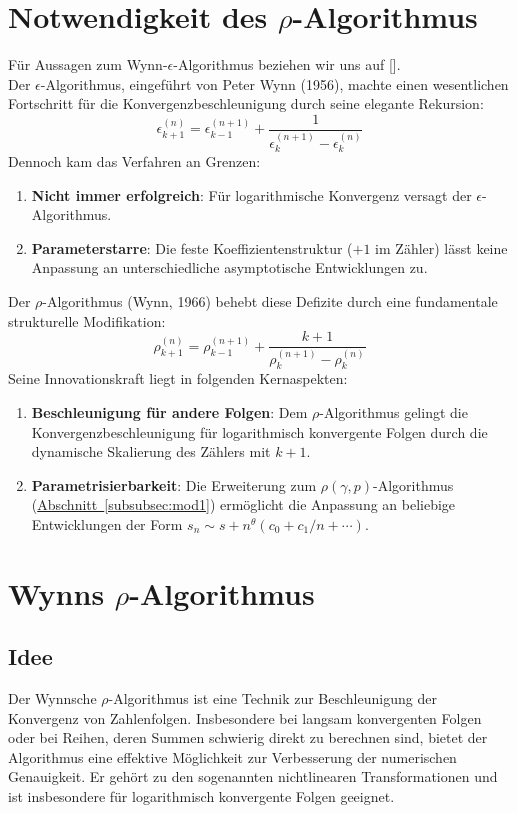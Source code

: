 \documentclass[a4paper,12pt]{article}
\numberwithin{equation}{section}
\newcommand{\secref}[1]{\hyperref[#1]{Abschnitt~\ref*{#1}}}
\theoremstyle{remark}
\begin{document}
\section{Notwendigkeit des $\rho$-Algorithmus}\label{sec:notwendigkeit}
Für Aussagen zum Wynn-$\epsilon$-Algorithmus beziehen wir uns auf [\cite{wynn1966convergence}].\\

Der $\epsilon$-Algorithmus, eingeführt von Peter Wynn (1956), machte einen wesentlichen Fortschritt für die Konvergenzbeschleunigung durch seine elegante Rekursion:
\[
\epsilon_{k+1}^{(n)} = \epsilon_{k-1}^{(n+1)} + \frac{1}{\epsilon_k^{(n+1)} - \epsilon_k^{(n)}}
\]
Dennoch kam das Verfahren an Grenzen:
\begin{enumerate}
\item \textbf{Nicht immer erfolgreich}: Für logarithmische Konvergenz  versagt der $\epsilon$-Algorithmus.
\item \textbf{Parameterstarre}: Die feste Koeffizientenstruktur ($+1$ im Zähler) lässt keine Anpassung an unterschiedliche asymptotische Entwicklungen zu.
\end{enumerate}
Der $\rho$-Algorithmus (Wynn, 1966) behebt diese Defizite durch eine fundamentale strukturelle Modifikation:
\[
\rho_{k+1}^{(n)} = \rho_{k-1}^{(n+1)} + \frac{k+1}{\rho_k^{(n+1)} - \rho_k^{(n)}}
\]
Seine Innovationskraft liegt in folgenden Kernaspekten:
\begin{enumerate}
\item \textbf{Beschleunigung für andere Folgen}: Dem $\rho$-Algorithmus gelingt die Konvergenzbeschleunigung für logarithmisch konvergente Folgen durch die dynamische Skalierung des Zählers mit $k+1$.
\item \textbf{Parametrisierbarkeit}: Die Erweiterung zum $\rho(\gamma,p)$-Algorithmus (\secref{subsubsec:mod1}) ermöglicht die Anpassung an beliebige Entwicklungen der Form $s_n \sim s + n^\theta(c_0 + c_1/n + \cdots)$.
\end{enumerate}

\section{Wynns $\rho$-Algorithmus}\label{sec:wynn}
\subsection{Idee}\label{subsec:idee}

Der Wynnsche $\rho$-Algorithmus ist eine Technik zur Beschleunigung der Konvergenz von Zahlenfolgen. Insbesondere bei langsam konvergenten Folgen oder bei Reihen, deren Summen schwierig direkt zu berechnen sind, bietet der Algorithmus eine effektive Möglichkeit zur Verbesserung der numerischen Genauigkeit. Er gehört zu den sogenannten nichtlinearen Transformationen und ist insbesondere für logarithmisch konvergente Folgen geeignet.
\end{document}
